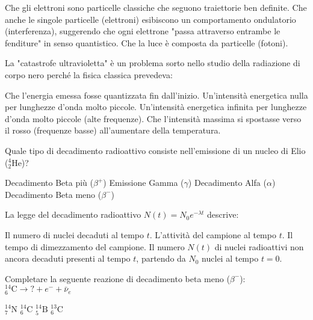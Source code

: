 \documentclass{exam}%
\begin{document}
\begin{questions}
\begin{choices}
\choice Che gli elettroni sono particelle classiche che seguono traiettorie ben definite.%
\choice Che anche le singole particelle (elettroni) esibiscono un comportamento ondulatorio (interferenza), suggerendo che ogni elettrone "passa attraverso entrambe le fenditure" in senso quantistico.%
\choice Che la luce è composta da particelle (fotoni).%
\end{choices}%
\question La "catastrofe ultravioletta" è un problema sorto nello studio della radiazione di corpo nero perché la fisica classica prevedeva:%
\vspace{0.2em}%
\begin{choices}%
\choice Che l'energia emessa fosse quantizzata fin dall'inizio.%
\choice Un'intensità energetica nulla per lunghezze d'onda molto piccole.%
\choice Un'intensità energetica infinita per lunghezze d'onda molto piccole (alte frequenze).%
\choice Che l'intensità massima si spostasse verso il rosso (frequenze basse) all'aumentare della temperatura.%
\end{choices}%
\question Quale tipo di decadimento radioattivo consiste nell'emissione di un nucleo di Elio ($^4_2\text{He}$)?%
\vspace{0.2em}%
\begin{multicols}{2}%
\begin{choices}%
\choice Decadimento Beta più ($\beta^+$)%
\choice Emissione Gamma ($\gamma$)%
\choice Decadimento Alfa ($\alpha$)%
\choice Decadimento Beta meno ($\beta^-$)%
\end{choices}%
\end{multicols}%
\question La legge del decadimento radioattivo $N(t) = N_0 e^{-\lambda t}$ descrive:%
\vspace{0.2em}%
\begin{choices}%
\choice Il numero di nuclei decaduti al tempo $t$.%
\choice L'attività del campione al tempo $t$.%
\choice Il tempo di dimezzamento del campione.%
\choice Il numero $N(t)$ di nuclei radioattivi non ancora decaduti presenti al tempo $t$, partendo da $N_0$ nuclei al tempo $t=0$.%
\end{choices}%
\question Completare la seguente reazione di decadimento beta meno ($\beta^-$): $^{14}_{6}\text{C} \rightarrow ? + e^- + \bar{\nu}_e$%
\vspace{0.2em}%
\begin{multicols}{4}%
\begin{choices}%
\choice $^{14}_{7}\text{N}$%
\choice $^{14}_{6}\text{C}$%
\choice $^{14}_{5}\text{B}$%
\choice $^{13}_{6}\text{C}$%
\end{choices}%

\end{multicols}
\end{questions}
\end{document}
